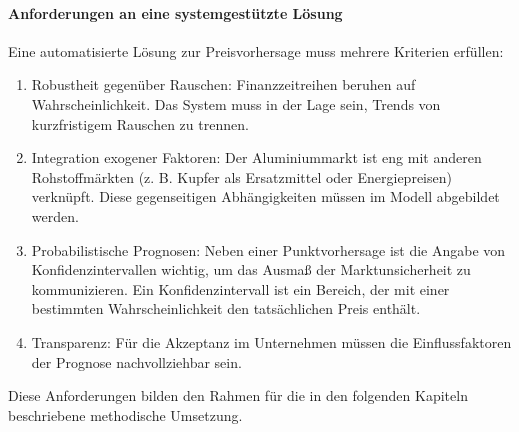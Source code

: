 \paragraph{Anforderungen an eine systemgestützte Lösung}
Eine automatisierte Lösung zur Preisvorhersage muss mehrere Kriterien erfüllen:
\begin{enumerate}
    \item Robustheit gegenüber Rauschen: Finanzzeitreihen beruhen auf Wahrscheinlichkeit. Das System muss in der Lage sein, Trends von kurzfristigem Rauschen zu trennen.
    \item Integration exogener Faktoren: Der Aluminiummarkt ist eng mit anderen Rohstoffmärkten (z. B. Kupfer als Ersatzmittel oder Energiepreisen) verknüpft. Diese gegenseitigen Abhängigkeiten müssen im Modell abgebildet werden.
    \item Probabilistische Prognosen: Neben einer Punktvorhersage ist die Angabe von Konfidenzintervallen wichtig, um das Ausmaß der Marktunsicherheit zu kommunizieren. Ein Konfidenzintervall ist ein Bereich, der mit einer bestimmten Wahrscheinlichkeit den tatsächlichen Preis enthält. 
    \item Transparenz: Für die Akzeptanz im Unternehmen müssen die Einflussfaktoren der Prognose nachvollziehbar sein.
\end{enumerate}
Diese Anforderungen bilden den Rahmen für die in den folgenden Kapiteln beschriebene methodische Umsetzung.